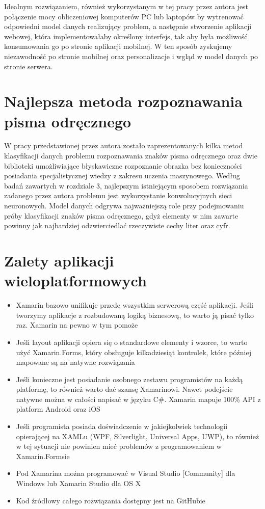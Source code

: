 \documentclass[brudnopis]{xmgr}
\begin{document}
Idealnym rozwiązaniem, również wykorzystanym w tej pracy przez autora jest połączenie mocy obliczeniowej komputerów PC lub laptopów by wytrenować odpowiedni model danych realizujący problem, a następnie stworzenie aplikacji webowej, która implementowałaby określony interfejs, tak aby była możliwość konsumowania go po stronie aplikacji mobilnej. W ten sposób zyskujemy niezawodność po stronie mobilnej oraz personalizacje i wgląd w model danych po stronie serwera.

\section{Najlepsza metoda rozpoznawania pisma odręcznego}

W pracy przedstawionej przez autora zostało zaprezentowanych kilka metod klasyfikacji
danych problemu rozpoznawania znaków pisma odręcznego oraz dwie
biblioteki umożliwiające błyskawiczne rozpoznanie obrazka bez konieczności posiadania
specjalistycznej wiedzy z zakresu uczenia maszynowego.
Według badań zawartych w rozdziale 3, najlepszym istniejącym sposobem rozwiązania
zadanego przez autora problemu jest wykorzystanie konwolucyjnych sieci
neuronowych. Model danych odgrywa najważniejszą role przy podejmowaniu
próby klasyfikacji znaków pisma odręcznego, gdyż elementy w nim zawarte powinny
jak najbardziej odzwierciedlać rzeczywiste cechy liter oraz cyfr.

\section{Zalety aplikacji wieloplatformowych}

\begin{itemize}
\item
Xamarin bazowo unifikuje przede wszystkim serwerową część aplikacji. Jeśli tworzymy aplikacje z rozbudowaną logiką biznesową, to warto ją pisać tylko raz. Xamarin na pewno w tym pomoże
\item
Jeśli layout aplikacji opiera się o standardowe elementy i wzorce, to warto użyć Xamarin.Forms, który obsługuje kilkadziesiąt kontrolek, które później mapowane są na natywne rozwiązania
\item
Jeśli konieczne jest posiadanie osobnego zestawu programistów na każdą platformę, to również warto dać szansę Xamarinowi. Nawet podejście natywne można w całości napisać w języku C\#. Xamarin mapuje 100\% API z platform Android oraz iOS
\item
Jeśli programista posiada doświadczenie w jakiejkolwiek technologii opierającej na XAMLu (WPF, Silverlight, Universal Apps, UWP), to również w tej sytuacji nie powinien mieć problemów z programowaniem w Xamarin.Formsie
\item
Pod Xamarina można programować w Visual Studio [Community] dla Windows lub Xamarin Studio dla OS X
\item
Kod źródłowy całego rozwiązania dostępny jest na GitHubie
\end{itemize}
\end{document}
